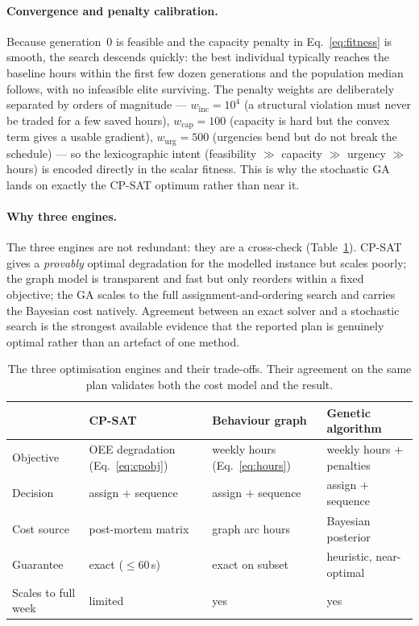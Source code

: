 \documentclass[11pt,a4paper]{article}
\begin{document}
\paragraph{Convergence and penalty calibration.}
Because generation~0 is feasible and the capacity penalty in
Eq.~\eqref{eq:fitness} is smooth, the search descends quickly: the best individual
typically reaches the baseline hours within the first few dozen generations and
the population median follows, with no infeasible elite surviving. The penalty
weights are deliberately separated by orders of magnitude --- $w_{\text{inc}}=10^4$
(a structural violation must never be traded for a few saved hours),
$w_{\text{cap}}=100$ (capacity is hard but the convex term gives a usable
gradient), $w_{\text{urg}}=500$ (urgencies bend but do not break the schedule) ---
so the lexicographic intent (feasibility $\gg$ capacity $\gg$ urgency $\gg$ hours)
is encoded directly in the scalar fitness. This is why the stochastic GA lands on
exactly the CP-SAT optimum rather than near it.

\paragraph{Why three engines.}
The three engines are not redundant: they are a cross-check
(Table~\ref{tab:engines}). CP-SAT gives a \emph{provably} optimal degradation for
the modelled instance but scales poorly; the graph model is transparent and fast
but only reorders within a fixed objective; the GA scales to the full
assignment-and-ordering search and carries the Bayesian cost natively. Agreement
between an exact solver and a stochastic search is the strongest available evidence
that the reported plan is genuinely optimal rather than an artefact of one method.

\begin{table}[H]\centering\small
\begin{tabular}{@{}llll@{}}
\toprule
 & \textbf{CP-SAT} & \textbf{Behaviour graph} & \textbf{Genetic algorithm} \\
\midrule
Objective      & OEE degradation (Eq.~\ref{eq:cpobj}) & weekly hours (Eq.~\ref{eq:hours}) & weekly hours $+$ penalties \\
Decision       & assign $+$ sequence & assign $+$ sequence & assign $+$ sequence \\
Cost source    & post-mortem matrix & graph arc hours & Bayesian posterior \\
Guarantee      & exact ($\le 60$\,s) & exact on subset & heuristic, near-optimal \\
Scales to full week & limited & yes & yes \\
\bottomrule
\end{tabular}
\caption{The three optimisation engines and their trade-offs. Their agreement on
the same plan validates both the cost model and the result.}
\label{tab:engines}
\end{table}
\end{document}
